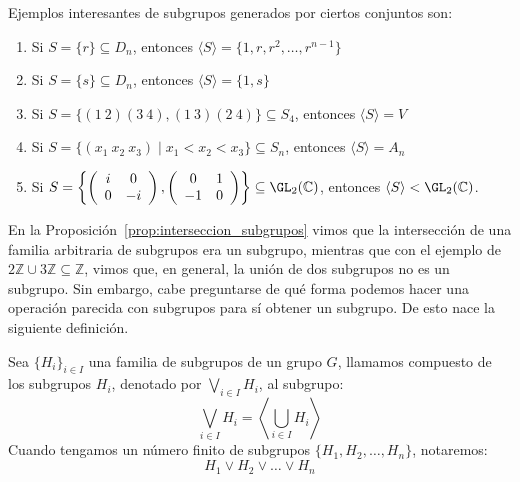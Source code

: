 \begin{ejemplo}
    Ejemplos interesantes de subgrupos generados por ciertos conjuntos son:
    \begin{enumerate}
        \item Si $S= \{r\}\subseteq D_n$, entonces $\langle S \rangle = \{1,r,r^2, \ldots, r^{n-1}\}$
        \item Si $S = \{s\}\subseteq D_n$, entonces $\langle S \rangle = \{1, s\}$
        \item Si $S = \{(1\ 2)(3\ 4), (1\ 3)(2\ 4)\}\subseteq S_4$, entonces $\langle S \rangle = V$
        \item Si $S=\{(x_1\ x_2\ x_3) \mid x_1<x_2<x_3\}\subseteq S_n$, entonces $\langle S \rangle = A_n$
        \item Si $S = \left\{\left(\begin{array}{cc}
            i & 0 \\
            0 & -i 
        \end{array}\right),  \left(\begin{array}{cc}
            0 & 1 \\
            -1 & 0 
        \end{array}\right)\right\}\subseteq \GL_2(\mathbb{C})$, entonces $\langle S \rangle < \GL_2(\mathbb{C})$.
    \end{enumerate}
\end{ejemplo}

En la Proposición~\ref{prop:interseccion_subgrupos} vimos que la intersección de una familia arbitraria de subgrupos era un subgrupo, mientras que con el ejemplo de $2\mathbb{Z}\cup 3\mathbb{Z}\subseteq \mathbb{Z}$, vimos que, en general, la unión de dos subgrupos no es un subgrupo. Sin embargo, cabe preguntarse de qué forma podemos hacer una operación parecida con subgrupos para sí obtener un subgrupo. De esto nace la siguiente definición.

\begin{definicion}[Compuesto]
    Sea $\{H_i\}_{i \in I}$ una familia de subgrupos de un grupo $G$, llamamos compuesto de los subgrupos $H_i$, denotado por $\bigvee\limits_{i \in I} H_i$, al subgrupo:
    \begin{equation*}
        \bigvee_{i \in I} H_i = \left\langle \bigcup_{i \in I} H_i \right\rangle 
    \end{equation*}
    Cuando tengamos un número finito de subgrupos $\{H_1, H_2, \ldots, H_n\}$, notaremos:
    \begin{equation*}
        H_1\lor H_2\lor \ldots \lor H_n
    \end{equation*}
\end{definicion}

